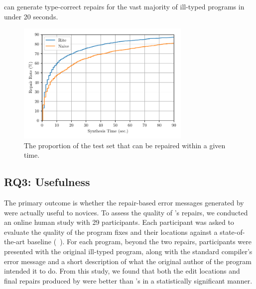 \begin{framed}
  \noindent \toolname can generate type-correct repairs for the vast majority of
  ill-typed programs in under 20 seconds.
\end{framed}



\begin{figure}
  \centering
  \includegraphics[height=2.3in]{cdf.pdf}
  \caption{The proportion of the test set that can be repaired within a given time.}
  \label{fig:rite_naive}
\end{figure}

\subsection{RQ3: Usefulness}
\label{sec:eval:useful}

The primary outcome is whether the repair-based
error messages generated by \toolname were actually useful to novices.
%
To assess the quality of \toolname's repairs, we conducted an online human
study with 29 participants.
%
Each participant was asked to evaluate the quality of the program fixes
and their locations against a state-of-the-art baseline
(\seminal ~\citep{Lerner2007-dt}).
%
For each program, beyond the two repairs, participants were presented
with the original ill-typed program, along with the standard \ocaml
compiler's error message and a short description of what the original
author of the program intended it to do.
%
From this study, we found that both the edit locations and final
repairs produced by \toolname were better than
\seminal's in a statistically significant manner.

